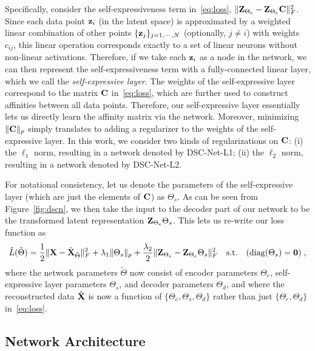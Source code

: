 \documentclass{article}
\begin{document}
Specifically, consider the self-expressiveness term in~\eqref{eq:loss},  $\|{\bf Z}_{\Theta_e} - {\bf Z}_{\Theta_e}{\bf C}\|_F^2$. Since each data point ${\bf z}_i$ (in the latent space) is approximated by a weighted linear combination of other points $\{{\bf z}_j\}_{j=1,\cdots,N}$ (optionally, $j\neq i$) with weights $c_{ij}$, this linear operation corresponds exactly to a set of linear neurons without non-linear activations. Therefore, if we take each ${\bf z}_i$ as a node in the network, we can then represent the self-expressiveness term with a fully-connected linear layer, which we call the {\it self-expressive layer}. The weights of the self-expressive layer correspond to the matrix ${\bf C}$ in~\eqref{eq:loss}, which are further used to construct affinities between all data points. Therefore, our self-expressive layer essentially lets us directly learn the affinity matrix via the network. Moreover, minimizing $\|{\bf C}\|_p$ simply translates to adding a regularizer to the weights of the self-expressive layer. In this work, we consider two kinds of regularizations on ${\bf C}$: (i)  the $\ell_1$ norm, resulting in a network denoted by DSC-Net-L1; (ii) the $\ell_2$ norm, resulting in a network denoted by DSC-Net-L2.

For notational consistency, let us denote the parameters of the self-expressive layer (which are just the elements of ${\bf C}$) as $\Theta_s$. As can be seen from Figure~\ref{fig:dscn}, we then take the input to the decoder part of our network to be the transformed latent representation ${\bf Z}_{\Theta_e}\Theta_s$. This lets us re-write our loss function as
\begin{equation}
\label{eq:loss2}
\tilde{L}(\tilde{\Theta}) = \frac{1}{2}\|{\bf X} - \hat{\bf X}_{\tilde{\Theta}}\|_F^2 + \lambda_1 \|\Theta_s\|_p + \frac{\lambda_2}{2}\|{\bf Z}_{\Theta_e} - {\bf Z}_{\Theta_e}\Theta_s\|_F^2\quad {\rm s.t.}\quad  ({\rm diag}(\Theta_s) = {\bf 0})\;,
\end{equation}
where the network parameters $\tilde{\Theta}$ now consist of encoder parameters $\Theta_e$, self-expressive layer parameters $\Theta_s$, and decoder parameters $\Theta_d$, and where the reconstructed data $\hat{\bf X}$ is now a function of $\{\Theta_e, \Theta_s, \Theta_d\}$ rather than just $\{\Theta_e, \Theta_d\}$ in~\eqref{eq:loss}.


\subsection{Network Architecture}
\end{document}
